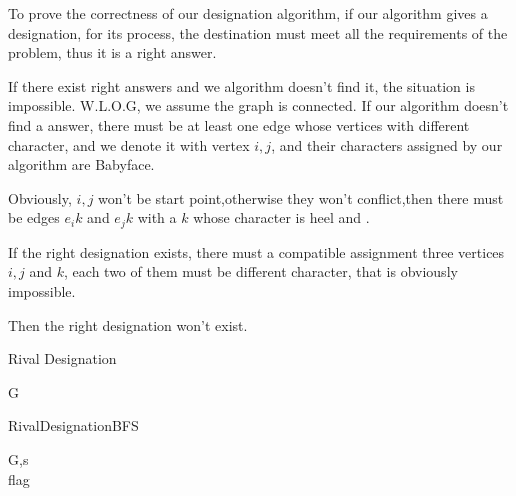 \documentclass[oneside]{homework} %
\begin{document}
To prove the correctness of our designation algorithm, if our algorithm gives a designation, for its process, the destination must meet all the requirements of the problem, thus it is a right answer. 

If there exist right answers and we algorithm doesn't find it, the situation is impossible. W.L.O.G, we assume the graph is connected. If our algorithm doesn't find a answer, there must be at least one edge whose vertices with different character, and we denote it with vertex $\mathit{i}, \mathit{j}$, and their characters assigned by our algorithm are Babyface. 

Obviously,  $\mathit{i}, \mathit{j}$ won't be start point,otherwise they won't conflict,then there must be edges $e_{i}{k}$ and $e_{j}{k}$ with a $\mathit{k}$ whose character is heel and .

If the right designation exists, there must a compatible assignment three vertices $\mathit{i}, \mathit{j}$ and $\mathit{k}$, each two of them must be different character, that is obviously impossible.

Then the right designation won't exist. 

\begin{algorithm}[h]
  \caption{Rival Designation}
  \label{algo:rd}
  \begin{algorithmic}[1]
	\REQUIRE G
	\ENSURE ~ ~\\ 
	\ENDFOR
	  \ENDIF
	\ENDWHILE
  \end{algorithmic}
\end{algorithm}

\begin{algorithm}[h]
  \caption{RivalDesignationBFS}
  \label{algo:rdBFS}
  \begin{algorithmic}[1]
	\REQUIRE G,s
	\ENSURE ~ ~\\ 
		  \ELSE
		  \ENDIF
		\ENDIF
		\ENDIF
	  \ENDFOR
	\ENDWHILE
	\LASTCON flag
  \end{algorithmic}
\end{algorithm}
\end{document}
